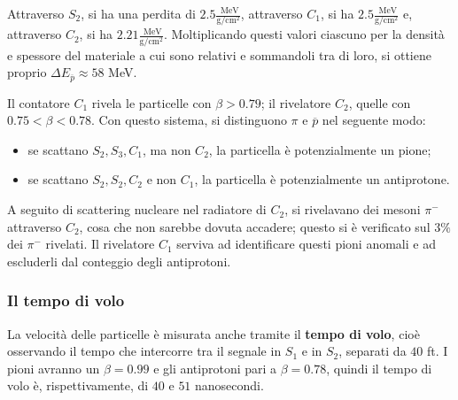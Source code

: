 \documentclass[10pt, a4paper]{scrartcl}
\numberwithin{equation}{subsection}
\theoremstyle{style1}
\begin{document}
Attraverso $S_2$, si ha una perdita di $2.5 \frac{\text{ MeV}}{\text{g}/\text{cm}^2}$, attraverso $C_1$, si ha $2.5 \frac{\text{ MeV}}{\text{g}/\text{cm}^2}$ e, attraverso $C_2$, si ha $2.21 \frac{\text{ MeV}}{\text{g}/\text{cm}^2}$. Moltiplicando questi valori ciascuno per la densit\`a e spessore del materiale a cui sono relativi e sommandoli tra di loro, si ottiene proprio $\Delta E_{\overline{p}} \approx 58$ MeV.

Il contatore $C_1$ rivela le particelle con $\beta > 0.79$; il rivelatore $C_2$, quelle con $0.75 < \beta < 0.78$. Con questo sistema, si distinguono $\pi$ e $\overline{p}$ nel seguente modo:
\begin{itemize}
	\item se scattano $S_2, S_3, C_1$, ma non $C_2$, la particella \`e potenzialmente un pione;
	\item se scattano $S_2,S_2, C_2$ e non $C_1$, la particella \`e potenzialmente un antiprotone.
\end{itemize}
A seguito di scattering nucleare nel radiatore di $C_2$, si rivelavano dei mesoni $\pi^-$ attraverso $C_2$, cosa che non sarebbe dovuta accadere; questo si \`e verificato sul $3\%$ dei $\pi^-$ rivelati. Il rivelatore $C_1$ serviva ad identificare questi pioni anomali e ad escluderli dal conteggio degli antiprotoni.
\subsubsection{Il tempo di volo}
La velocit\`a delle particelle \`e misurata anche tramite il \textbf{tempo di volo}, cio\`e osservando il tempo che intercorre tra il segnale in $S_1$ e in $S_2$, separati da $40$ ft. I pioni avranno un $\beta = 0.99$ e gli antiprotoni pari a $\beta  = 0.78$, quindi il tempo di volo \`e, rispettivamente, di $40$ e $51$ nanosecondi.
\end{document}
